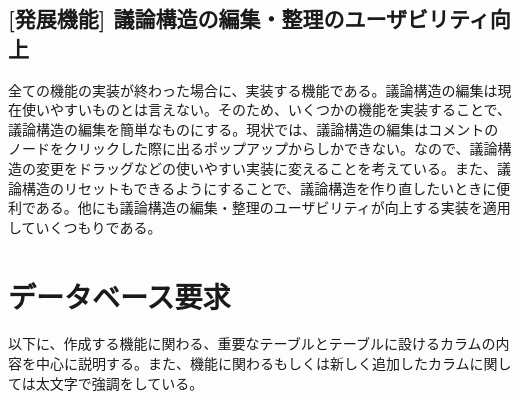 \documentclass[12pt, oneside]{jreport}
\begin{document}
		\subsection{[発展機能] 議論構造の編集・整理のユーザビリティ向上}
		全ての機能の実装が終わった場合に、実装する機能である。議論構造の編集は現在使いやすいものとは言えない。そのため、いくつかの機能を実装することで、議論構造の編集を簡単なものにする。現状では、議論構造の編集はコメントのノードをクリックした際に出るポップアップからしかできない。なので、議論構造の変更をドラッグなどの使いやすい実装に変えることを考えている。また、議論構造のリセットもできるようにすることで、議論構造を作り直したいときに便利である。他にも議論構造の編集・整理のユーザビリティが向上する実装を適用していくつもりである。

	\section{データベース要求}
	
	以下に、作成する機能に関わる、重要なテーブルとテーブルに設けるカラムの内容を中心に説明する。また、機能に関わるもしくは新しく追加したカラムに関しては太文字で強調をしている。
	
\end{document}
